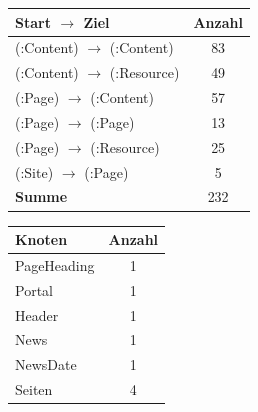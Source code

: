 \begin{table}[htb]
        \begin{subtable}[c]{0.5\textwidth}
            \centering
            \begin{tabular}{|l|c|}
                \hline
                \textbf{Start $\rightarrow$ Ziel} & \multicolumn{1}{l|}{\textbf{Anzahl}} \\ \hline
                (:Content) $\rightarrow$ (:Content)     & 83                                   \\ \hline
                (:Content) $\rightarrow$ (:Resource)    & 49                                   \\ \hline
                (:Page) $\rightarrow$ (:Content)        & 57                                   \\ \hline
                (:Page) $\rightarrow$ (:Page)           & 13                                   \\ \hline
                (:Page) $\rightarrow$ (:Resource)       & 25                                   \\ \hline
                (:Site) $\rightarrow$ (:Page)           & 5                                    \\ \hline
                \textbf{Summe}                    & 232                                  \\ \hline
            \end{tabular}
            \label{table:findingsNewsFiguresEdgesByStartEndNodeLabel}
        \end{subtable}
        \begin{subtable}[c]{0.5\textwidth}
            \centering
            \begin{tabular}{|l|c|}
                \hline
                \textbf{Knoten} & \multicolumn{1}{l|}{\textbf{Anzahl}} \\ \hline
                PageHeading     & 1                                    \\ \hline
                Portal          & 1                                    \\ \hline
                Header          & 1                                    \\ \hline
                News            & 1                                    \\ \hline
                NewsDate        & 1                                    \\ \hline
                Seiten          & 4                                    \\ \hline

\end{tabular}
\end{subtable}
\end{table}
